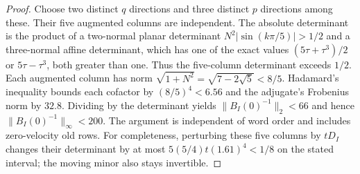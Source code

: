 \begin{proof}
Choose two distinct $q$ directions and three distinct $p$ directions
among these. Their five augmented columns are independent. The
absolute determinant is the product of a two-normal planar determinant
$N^2|\sin(k\pi/5)|>1/2$ and a three-normal affine determinant, which
has one of the exact values $(5\tau+\tau^3)/2$ or $5\tau-\tau^3$,
both greater than one. Thus the five-column determinant exceeds
$1/2$. Each augmented column has norm
$\sqrt{1+N^2}=\sqrt{7-2\sqrt5}<8/5$. Hadamard's inequality bounds
each cofactor by $(8/5)^4<6.56$ and the adjugate's Frobenius norm by
$32.8$. Dividing by the determinant yields
$\|B_I(0)^{-1}\|_2<66$ and hence
$\|B_I(0)^{-1}\|_\infty<200$.
The argument is independent of word order and includes zero-velocity
old rows. For completeness, perturbing these five columns by
$tD_I$ changes their determinant by at most
$5(5/4)t(1.61)^4<1/8$ on the stated interval; the moving minor also
stays invertible.
\end{proof}

